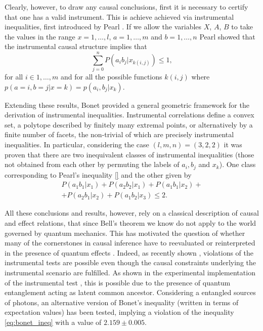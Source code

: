 \documentclass[letterpaper]{article}
\begin{document}
Clearly, however, to draw any causal conclusions, first it is necessary to certify that one has a valid instrument. This is achieve achieved via instrumental inequalities, first introduced by Pearl \cite{}. If we allow the variables $X$, $A$, $B$ to take the values in the range  $x=1,\dots,l$, $a=1,\dots,m$ and $b=1,\dots,n$ Pearl showed that the instrumental causal structure implies that 
\begin{equation} 
    \sum_{j=0}^{n} P(a_i b_j|x_{k(i,j)}) \le 1,
    \label{eq:pearl_ineq}
\end{equation}
for all $i \in {1,\ldots, m}$ and for all the possible functions $k(i,j)$ where $p(a=i,b=j\vert x=k)=p(a_i,b_j|x_k)$.

Extending these results, Bonet \cite{bonet2001} provided a 
general geometric framework for the derivation of instrumental inequalities. Instrumental correlations define a convex set, a polytope described by finitely many extremal points, or alternatively by a finite number of facets, the non-trivial of which are precisely instrumental inequalities. In particular, considering the case $(l,m,n) = (3,2,2)$ it was proven that there are two inequivalent classes of instrumental inequalities (those not obtained from each other by permuting the labels of $a_i,b_j$ and $x_k$). One class corresponding to Pearl's inequality \eqref{} and the other given by
\begin{multline}
    P(a_1 b_1 | x_1) + P(a_2 b_2 | x_1) + 
    P(a_1 b_1 | x_2) +\\+ P(a_2 b_1 | x_2) + 
    P(a_1 b_2 | x_3) \le 2.
    \label{eq:bonet_ineq}
\end{multline}

All these conclusions and results, however, rely on a classical description of causal and effect relations, that since Bell's theorem \cite{} we know do not apply to the world governed by quantum mechanics. This has motivated the question of whether many of the cornerstones in causal inference have to reevaluated or reinterpreted in the presence of quantum effects \cite{}. Indeed, as recently shown \cite{chaves2018}, violations of the instrumental tests are possible even though the causal constraints underlying the instrumental scenario are fulfilled. As shown in the experimental implementation of the instrumental test \cite{}, this is possible due to the presence of quantum entanglement acting as latent common ancestor. Considering a entangled sources of photons, an alternative version of Bonet's inequality (written in terms of expectation values) has been tested, implying a violation of the inequality \eqref{eq:bonet_ineq} with a 
value of $2.159 \pm 0.005$. 
\end{document}
